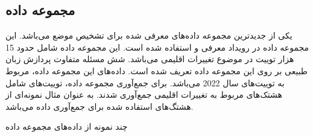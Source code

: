 \subsection{مجموعه داده
}\label{sec:datasetClimaConvo}
یکی از جدید‌ترین مجموعه داده‌های معرفی شده برای تشخیص موضع
 \cite{shiwakoti2024analyzing}
می‌باشد. این مجموعه داده در رویداد
\cite{thapa2024stance}
معرفی و استفاده شده است. این مجموعه داده شامل حدود 15 هزار توییت در موضوع تغییرات اقلیمی می‌باشد. شش مسئله متفاوت پردازش زبان طبیعی بر روی این مجموعه داده تعریف شده است. داده‌های این مجموعه داده، مربوط به توییت‌های سال 2022 می‌باشد. برای جمع‌آوری مجموعه داده، توییت‌های شامل هشتک‌های مربوط به تغییرات اقلیمی جمع‌آوری شدند.  به عنوان مثال
نمونه‌ای از هشتگ‌های استفاده شده برای جمع‌آوری داده می‌باشد.
\begin{table}[ht]
	\centering
	\small
	\caption[چند نمونه از دادە‌های مجموعه داده
	]{\label{dataset-climate-convo}  چند نمونه از دادە‌های مجموعه داده
		\cite{shiwakoti2024analyzing}}
	
	\begin{figure}[H]
	\end{figure}
	
\end{table}


